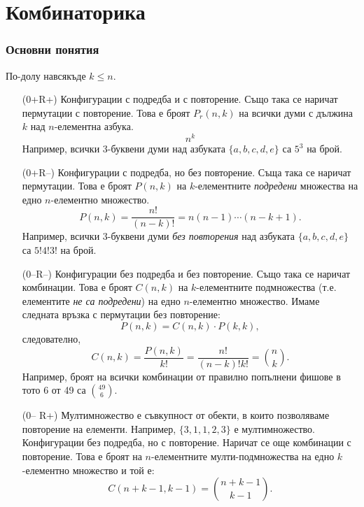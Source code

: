 \chapter{Комбинаторика}

\subsection*{Основни понятия}

По-долу навсякъде $k \leq n$.
\begin{enumerate}
\item[(0+R+)]
  Конфигурации с подредба и с повторение.
  Също така се наричат пермутации с повторение.
  Това е броят $P_r(n,k)$ на всички думи с дължина $k$ над $n$-елементна азбука.
  \[n^k\]
  Например, всички 3-буквени думи над азбуката $\{a,b,c,d,e\}$ са $5^3$ на брой.
\item[(0+R--)]
  Конфигурации с подредба, но без повторение. 
  Съща така се наричат пермутации.
  Това е броят $P(n,k)$ на $k$-елементните {\em подредени} множества на едно $n$-елементно множество.
  \[P(n,k) = \frac{n!}{(n-k)!} = n(n-1)\cdots(n-k+1).\]
  Например, всички 3-буквени думи {\em без повторения} над азбуката $\{a,b,c,d,e\}$
  са $5!4!3!$ на брой.
\item[(0--R--)]
  Конфигурации без подредба и без повторение.
  Също така се наричат комбинации.
  Това е броят $C(n,k)$ на $k$-елементните подмножества (т.е. елементите {\em не са подредени}) на едно $n$-елементно множество.
  Имаме следната връзка с пермутации без повторение:
  \[P(n,k) = C(n,k)\cdot P(k,k),\] следователно,
  \[C(n,k) =  \frac{P(n,k)}{k!} = \frac{n!}{(n-k)!k!} = \binom{n}{k}.\]
  Например, броят на всички комбинации от правилно попълнени фишове в тото 6 от 49 са $\binom{49}{6}$.
\item[(0-- R+)]
  Мултимножество е съвкупност от обекти, в които позволяваме повторение на елементи.
  Например, $\{3,1,1,2,3\}$ е мултимножество.
  Конфигурации без подредба, но с повторение.
  Наричат се още комбинации с повторение.
  Това е броят на $n$-елементните мулти-подмножества на едно $k$-елементно множество
  и той е:
  \[C(n+k-1,k-1) = \binom{n+k-1}{k-1}.\]
\end{enumerate}

